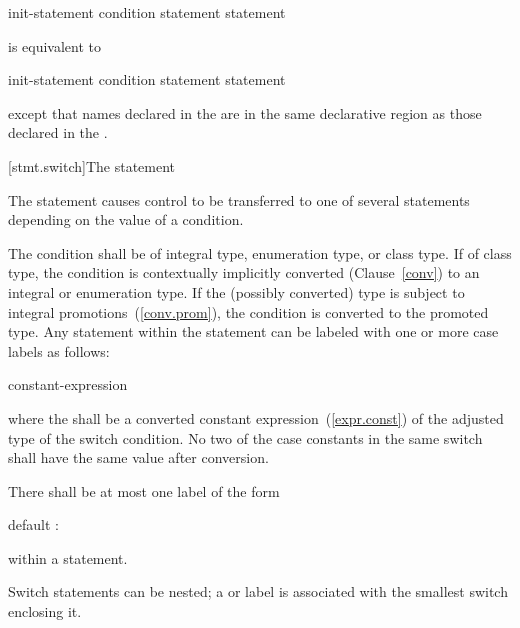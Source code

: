 \begin{ncbnf}
 init-statement condition \terminal{)} statement  statement
\end{ncbnf}

is equivalent to

\begin{ncbnftab}
\terminal{\{}\br
\>init-statement\br
\> condition \terminal{)} statement  statement\br
\terminal{\}}
\end{ncbnftab}

except that names declared in the  are in
the same declarative region as those declared in the
.

[stmt.switch]{The  statement}%

\pnum
The  statement causes control to be transferred to one of
several statements depending on the value of a condition.

\pnum
The condition shall be of integral type, enumeration type, or class
type. If of class type, the
condition is contextually implicitly converted (Clause~\ref{conv}) to
an integral or enumeration type.
If the (possibly converted) type is subject to integral
promotions~(\ref{conv.prom}), the condition is converted
to the promoted type. 
Any
statement within the  statement can be labeled with one or
more case labels as follows:

\begin{ncbnf}
%
 constant-expression \terminal{:}
\end{ncbnf}

where the  shall be
a converted constant expression~(\ref{expr.const}) of the
adjusted type of the switch condition. No two of the case constants in
the same switch shall have the same value after conversion.

\pnum
{}%
There shall be at most one label of the form

\begin{codeblock}
default :
\end{codeblock}

within a  statement.

\pnum
Switch statements can be nested; a  or  label
is associated with the smallest switch enclosing it.

